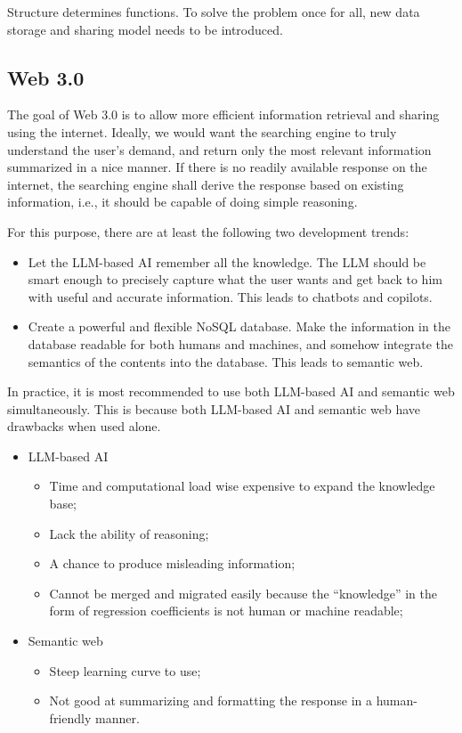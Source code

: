 Structure determines functions. To solve the problem once for all, new data storage and sharing model needs to be introduced.

\subsection{Web 3.0}

The goal of Web 3.0 is to allow more efficient information retrieval and sharing using the internet. Ideally, we would want the searching engine to truly understand the user's demand, and return only the most relevant information summarized in a nice manner. If there is no readily available response on the internet, the searching engine shall derive the response based on existing information, i.e., it should be capable of doing simple reasoning. 

For this purpose, there are at least the following two development trends:
\begin{itemize}
  \item Let the LLM-based AI remember all the knowledge. The LLM should be smart enough to precisely capture what the user wants and get back to him with useful and accurate information. This leads to chatbots and copilots.
  \item Create a powerful and flexible NoSQL database. Make the information in the database readable for both humans and machines, and somehow integrate the semantics of the contents into the database. This leads to semantic web.
\end{itemize}

In practice, it is most recommended to use both LLM-based AI and semantic web simultaneously. This is because both LLM-based AI and semantic web have drawbacks when used alone.
\begin{itemize}
	\item LLM-based AI
	\begin{itemize}
		\item Time and computational load wise expensive to expand the knowledge base;
		\item Lack the ability of reasoning;
		\item A chance to produce misleading information;
		\item Cannot be merged and migrated easily because the ``knowledge'' in the form of regression coefficients is not human or machine readable;
	\end{itemize}
	\item Semantic web
	\begin{itemize}
		\item Steep learning curve to use;
		\item Not good at summarizing and formatting the response in a human-friendly manner.
	\end{itemize}
\end{itemize}

